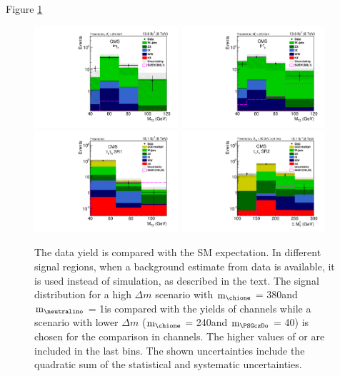 Figure \ref{fig:yield_final}
\begin{figure}[!htb]
\centering
\includegraphics[width=0.475\textwidth,keepaspectratio=true]{StatisticsFig/MT2_tauMTgt200_DDFakeEleTau.pdf}
\includegraphics[width=0.475\textwidth,keepaspectratio=true]{StatisticsFig/MT2muTau_tauMTgt200_DDFake.pdf}
\includegraphics[width=0.475\textwidth,keepaspectratio=true]{StatisticsFig/QCDWestimation_bin1.pdf}
\includegraphics[width=0.475\textwidth,keepaspectratio=true]{StatisticsFig/QCDWestimation_bin2.pdf}
\caption{The data yield is compared with the SM expectation. In different signal regions, 
when a background estimate from data is available, it is used instead of simulation, as described in the text. The signal distribution for a high $\Delta m$ scenario with ${\rm{m}}_{\chione}$ = 380\GeV and ${\rm{m}}_{\neutralino}$ = 1\GeV is compared with the yields of \leptonTau channels while a scenario with lower $\Delta m$ (${\rm{m}}_{\chione}$ = 240\GeV and ${\rm{m}}_{\PSGczDo}$ = 40\GeV) is chosen for the comparison in \tauTau channels. The higher values of \mttwo or \SumMT are included in the last bins. The shown uncertainties include the quadratic sum of the statistical and systematic uncertainties.}
\label{fig:yield_final}
\end{figure}

